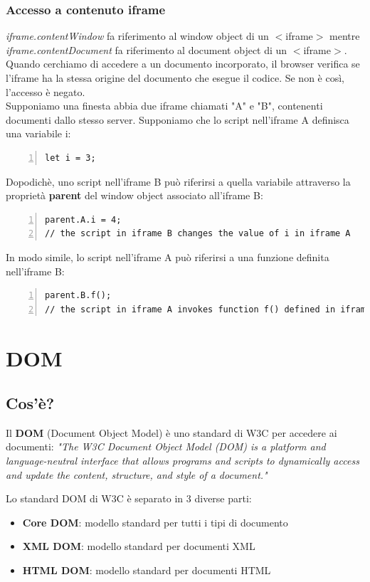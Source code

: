 \subsection{Accesso a contenuto iframe}
\emph{iframe.contentWindow} fa riferimento al window object di un $<$iframe$>$ mentre \emph{iframe.contentDocument} fa riferimento al document object di un $<$iframe$>$. Quando cerchiamo di accedere a un documento incorporato, il browser verifica se l'iframe ha la stessa origine del documento che esegue il codice. Se non è così, l'accesso è negato. \\

Supponiamo una finesta abbia due iframe chiamati "A" e "B", contenenti documenti dallo stesso server. Supponiamo che lo script nell'iframe A definisca una variabile i:
\begin{Verbatim}[frame = single, numbers = left]
let i = 3;
\end{Verbatim}
Dopodichè, uno script nell'iframe B può riferirsi a quella variabile attraverso la proprietà \textbf{parent} del window object associato all'iframe B:
\begin{Verbatim}[frame = single, numbers = left]
parent.A.i = 4;    
// the script in iframe B changes the value of i in iframe A
\end{Verbatim}
In modo simile, lo script nell'iframe A può riferirsi a una funzione definita nell'iframe B:
\begin{Verbatim}[frame=single, numbers=left]
parent.B.f(); 
// the script in iframe A invokes function f() defined in iframe B
\end{Verbatim}


\chapter{DOM}
\section{Cos'è?}
Il \textbf{DOM} (Document Object Model) è uno standard di W3C per accedere ai documenti: \emph{"The W3C Document Object Model (DOM) is a platform and
language-neutral interface that allows programs and scripts to
dynamically access and update the content, structure, and style of
a document."}

Lo standard DOM di W3C è separato in 3 diverse parti:
\begin{itemize}
    \item \textbf{Core DOM}: modello standard per tutti i tipi di documento
    \item \textbf{XML DOM}: modello standard per documenti XML
    \item \textbf{HTML DOM}: modello standard per documenti HTML
\end{itemize}


